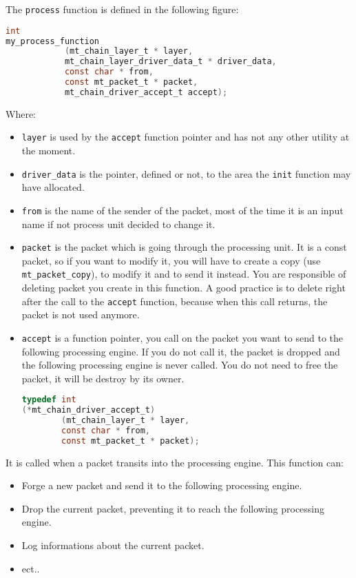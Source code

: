The \texttt{process} function is defined in the following figure:
\begin{lstlisting}[language=C,
caption=Processing engine's process function prototype]
int 
my_process_function
            (mt_chain_layer_t * layer,
            mt_chain_layer_driver_data_t * driver_data,
            const char * from,
            const mt_packet_t * packet,
            mt_chain_driver_accept_t accept);
\end{lstlisting}
Where:
\begin{itemize}
\item \texttt{layer} is used by the \texttt{accept}
function pointer and has not any other utility at the moment.
\item \texttt{driver\_data} is the pointer, defined or not, to the
area the \texttt{init} function may have allocated.
\item \texttt{from} is the name of the sender of the packet, most of the
time it is an input name if not process unit decided to change it.
\item \texttt{packet} is the packet which is going through the
processing unit. It is a const packet, so if you want to modify it,
you will have to create a copy (use \texttt{mt\_packet\_copy}), to modify it 
and to send it instead. You are responsible of deleting packet you create
in this function. A good practice is to delete right after the call to the
\texttt{accept} function, because when this call returns, the packet
is not used anymore.
\item \texttt{accept} is a function pointer,  you call on the packet 
you want to send to the following processing engine. If you do not call it, 
the packet is dropped and the following processing engine is never 
called. You do not need to free the packet, it will be destroy by its owner.
\begin{lstlisting}[language=C,
caption=Processing engine's accept function pointer]
typedef int
(*mt_chain_driver_accept_t)
        (mt_chain_layer_t * layer,
        const char * from,
        const mt_packet_t * packet);
\end{lstlisting}
\end{itemize}

It is called when a packet transits into the processing engine. This
function can:

\begin{itemize}
\item Forge a new packet and send it to the following processing
engine.
\item Drop the current packet, preventing it to reach the following
processing engine.
\item Log informations about the current packet.
\item ect..
\end{itemize}


